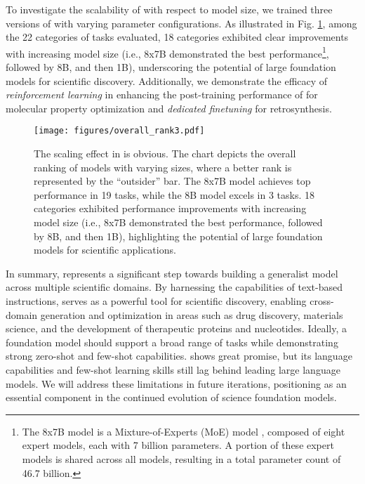 To investigate the scalability of \ourM{} with respect to model size, we trained three versions of \ourM{} with varying parameter configurations. As illustrated in Fig. \ref{fig:overallrank}, among the 22 categories of tasks evaluated, 18 categories exhibited clear improvements with increasing model size (i.e., 8x7B demonstrated the best performance\footnote{The 8x7B model is a Mixture-of-Experts (MoE) model \cite{jiang2024mixtralexperts}, composed of eight expert models, each with 7 billion parameters. A portion of these expert models is shared across all models, resulting in a total parameter count of 46.7 billion.}, followed by 8B, and then 1B), underscoring the potential of large foundation models for scientific discovery. Additionally, we demonstrate the efficacy of \emph{reinforcement learning} in enhancing the post-training performance of \ourM{} for molecular property optimization and \emph{dedicated finetuning} for retrosynthesis.


\begin{figure}[!htb]
\centering
\texttt{[image: figures/overall\_rank3.pdf]}
\caption{The scaling effect in \ourM{} is obvious. The chart depicts the overall ranking of models with varying sizes, where a better rank is represented by the ``outsider'' bar. The 8x7B model achieves top performance in 19 tasks, while the 8B model excels in 3 tasks. 18 categories exhibited performance improvements with increasing model size (i.e., 8x7B demonstrated the best performance, followed by 8B, and then 1B), highlighting the potential of large foundation models for scientific applications. }
\label{fig:overallrank}
\end{figure}

In summary, \ourM{} represents a significant step towards building a generalist model across multiple scientific domains. By harnessing the capabilities of text-based instructions, \ourM{} serves as a powerful tool for scientific discovery, enabling cross-domain generation and optimization in areas such as drug discovery, materials science, and the development of therapeutic proteins and nucleotides. 
Ideally, a foundation model should support a broad range of tasks while demonstrating strong zero-shot and few-shot capabilities.
\ourM{} shows great promise, but its language capabilities and few-shot learning skills still lag behind leading large language models. We will address these limitations in future iterations, positioning \ourM{} as an essential component in the continued evolution of science foundation models.
